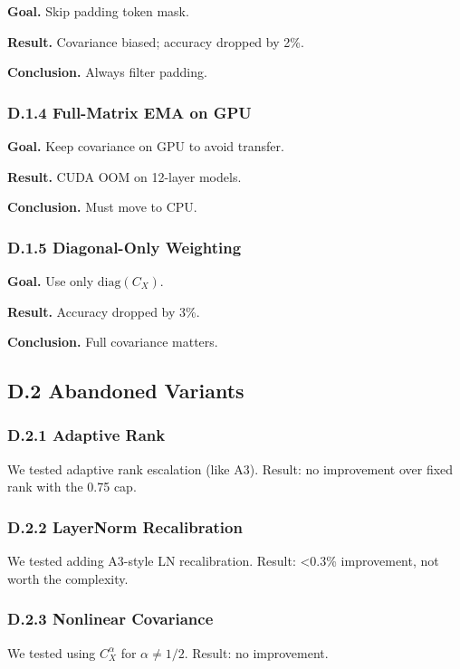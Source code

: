 \textbf{Goal.} Skip padding token mask.

\textbf{Result.} Covariance biased; accuracy dropped by 2\%.

\textbf{Conclusion.} Always filter padding.

\subsubsection{D.1.4 Full-Matrix EMA on GPU}

\textbf{Goal.} Keep covariance on GPU to avoid transfer.

\textbf{Result.} CUDA OOM on 12-layer models.

\textbf{Conclusion.} Must move to CPU.

\subsubsection{D.1.5 Diagonal-Only Weighting}

\textbf{Goal.} Use only $\mathrm{diag}(C_X)$.

\textbf{Result.} Accuracy dropped by 3\%.

\textbf{Conclusion.} Full covariance matters.

\subsection{D.2 Abandoned Variants}

\subsubsection{D.2.1 Adaptive Rank}

We tested adaptive rank escalation (like A3). Result: no improvement over 
fixed rank with the 0.75 cap.

\subsubsection{D.2.2 LayerNorm Recalibration}

We tested adding A3-style LN recalibration. Result: <0.3\% improvement, not 
worth the complexity.

\subsubsection{D.2.3 Nonlinear Covariance}

We tested using $C_X^\alpha$ for $\alpha \neq 1/2$. Result: no improvement.

